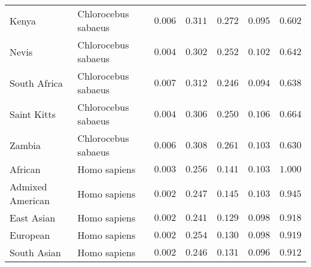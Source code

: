 \documentclass{article}
\begin{document}
\begin{center}
\begin{longtable}{|l|l|r|r|r|r|r|}
            Kenya                & Chlorocebus sabaeus & $ 0.006$              & $ 0.311$                  & $ 0.272$                & $ 0.095$                   & $ 0.602$                       \\
            Nevis                & Chlorocebus sabaeus & $ 0.004$              & $ 0.302$                  & $ 0.252$                & $ 0.102$                   & $ 0.642$                       \\
            South Africa         & Chlorocebus sabaeus & $ 0.007$              & $ 0.312$                  & $ 0.246$                & $ 0.094$                   & $ 0.638$                       \\
            Saint Kitts          & Chlorocebus sabaeus & $ 0.004$              & $ 0.306$                  & $ 0.250$                & $ 0.106$                   & $ 0.664$                       \\
            Zambia               & Chlorocebus sabaeus & $ 0.006$              & $ 0.308$                  & $ 0.261$                & $ 0.103$                   & $ 0.630$                       \\
            African              & Homo sapiens        & $ 0.003$              & $ 0.256$                  & $ 0.141$                & $ 0.103$                   & $ 1.000$                       \\
            Admixed American     & Homo sapiens        & $ 0.002$              & $ 0.247$                  & $ 0.145$                & $ 0.103$                   & $ 0.945$                       \\
            East Asian           & Homo sapiens        & $ 0.002$              & $ 0.241$                  & $ 0.129$                & $ 0.098$                   & $ 0.918$                       \\
            European             & Homo sapiens        & $ 0.002$              & $ 0.254$                  & $ 0.130$                & $ 0.098$                   & $ 0.919$                       \\
            South Asian          & Homo sapiens        & $ 0.002$              & $ 0.246$                  & $ 0.131$                & $ 0.096$                   & $ 0.912$                       \\
        \end{longtable}
    \end{center}
\end{document}
